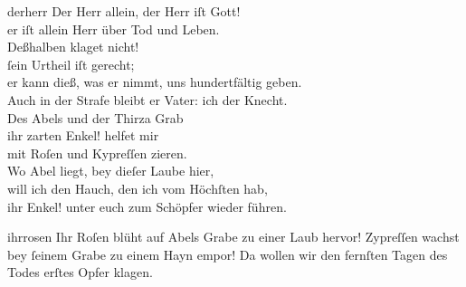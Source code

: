 \documentclass[tocstyle=ref-genre]{ees}
\begin{document}
{\begin{movement}{derherr}
  \voice[Adam]
  Der Herr allein, der Herr iſt Gott!\\
  er iſt allein Herr über Tod und Leben.\\
  Deßhalben klaget nicht!\\
  ſein Urtheil iſt gerecht;\\
  er kann dieß, was er nimmt, uns hundertfältig geben.\\
  Auch in der Strafe bleibt er Vater: ich der Knecht.\\
  Des Abels und der Thirza Grab\\
  ihr zarten Enkel! helfet mir\\
  mit Roſen und Kypreſſen zieren.\\
  Wo Abel liegt, bey dieſer Laube hier,\\
  will ich den Hauch, den ich vom Höchſten hab,\\
  ihr Enkel! unter euch zum Schöpfer wieder führen.
\end{movement}

\begin{movement}{ihrrosen}
  \voice[Chor]
  Ihr Roſen blüht auf Abels Grabe
  zu einer Laub hervor!
  Zypreſſen wachst bey ſeinem Grabe
  zu einem Hayn empor!
  Da wollen wir den fernſten Tagen
  des Todes erſtes Opfer klagen.
\end{movement}
}

\eesScore
\end{document}
